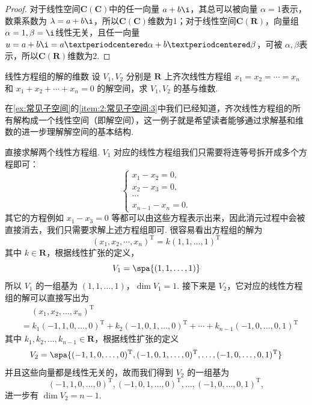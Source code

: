 \begin{proof}
    对于线性空间$\mathbf{C}(\mathbf{C})$中的任一向量 $a + b\i$，其总可以被向量 $\alpha = 1$表示，数乘系数为 $\lambda = a + b\i$，所以$\mathbf{C}(\mathbf{C})$维数为1；对于线性空间$\mathbf{C}(\mathbf{R})$，向量组 $\alpha = 1, \beta = \i$线性无关，且任一向量 $u = a + b\i = a·\alpha + b·\beta$，可被 $\alpha, \beta$表示，所以$\mathbf{C}(\mathbf{R})$维数为2.
\end{proof}

\begin{example}{}{线性方程组的解的维数}
    设 $V_1, V_2$ 分别是 $\mathbf{R}$ 上齐次线性方程组 $x_1 = x_2 = \cdots = x_n$ 和 $x_1 + x_2 + \cdots + x_n = 0$ 的解空间，求 $V_1, V_2$ 的基与维数.
\end{example}

在\autoref{ex:常见子空间}的\ref{item:2:常见子空间:3}中我们已经知道，齐次线性方程组的所有解构成一个线性空间（即解空间），这一例子就是希望读者能够通过求解基和维数的进一步理解解空间的基本结构.

\begin{solution}
    直接求解两个线性方程组. $V_1$ 对应的线性方程组我们只需要将连等号拆开成多个方程即可：
    \[\begin{cases}
        x_1 - x_2 = 0, \\
        x_2 - x_3 = 0, \\
        \cdots \\
        x_{n-1} - x_n = 0.
    \end{cases}\]
    其它的方程例如 $x_1 - x_3 = 0$ 等都可以由这些方程表示出来，因此消元过程中会被直接消去，我们只需要求解上述方程组即可. 很容易看出方程组的解为
    \[(x_1,x_2,\cdots,x_n)^\mathrm{T} = k(1,1,\ldots,1)^\mathrm{T}\]
    其中 $k\in\mathbf{R}$，根据线性扩张的定义，
    \[V_1 = \spa\{(1,1,\ldots,1)\}\]
    所以 $V_1$ 的一组基为 $(1,1,\ldots,1)$，$\dim V_1 = 1$. 接下来是 $V_2$，它对应的线性方程组的解可以直接写出为
    \begin{align*}
        &\quad\ (x_1,x_2,\ldots,x_n)^\mathrm{T} \\
        &= k_1(-1,1,0,\ldots,0)^\mathrm{T} + k_2(-1,0,1,\ldots,0)^\mathrm{T} + \cdots + k_{n-1}(-1,0,\ldots,0,1)^\mathrm{T}
    \end{align*}
    其中 $k_1,k_2,\ldots,k_{n-1}\in\mathbf{R}$，根据线性扩张的定义
    \[V_2 = \spa\{(-1,1,0,\ldots,0)^\mathrm{T},(-1,0,1,\ldots,0)^\mathrm{T},\ldots,(-1,0,\ldots,0,1)^\mathrm{T}\}\]
    并且这些向量都是线性无关的，故而我们得到 $V_2$ 的一组基为
    \[(-1,1,0,\ldots,0)^\mathrm{T},(-1,0,1,\ldots,0)^\mathrm{T},\ldots,(-1,0,\ldots,0,1)^\mathrm{T},\]
    进一步有 $\dim V_2 = n - 1$.
\end{solution}

